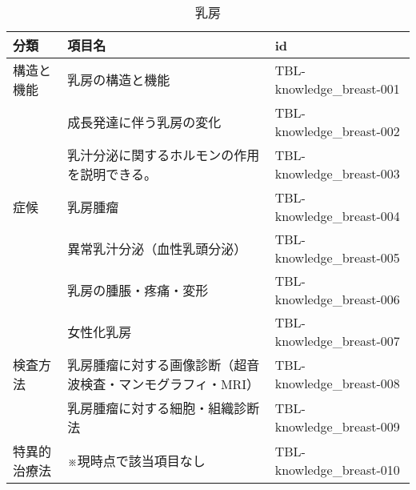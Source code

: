 \begin{xltabular}{\linewidth}{XXX}
\caption{\label{tbl:knowledge_breast}乳房} \\
\toprule
分類 & 項目名 & id \\
\midrule
\endhead
構造と機能 & 乳房の構造と機能 & TBL-knowledge_breast-001 \\
 & 成長発達に伴う乳房の変化 & TBL-knowledge_breast-002 \\
 & 乳汁分泌に関するホルモンの作用を説明できる。 & TBL-knowledge_breast-003 \\
症候 & 乳房腫瘤 & TBL-knowledge_breast-004 \\
 & 異常乳汁分泌（血性乳頭分泌） & TBL-knowledge_breast-005 \\
 & 乳房の腫脹・疼痛・変形 & TBL-knowledge_breast-006 \\
 & 女性化乳房 & TBL-knowledge_breast-007 \\
検査方法 & 乳房腫瘤に対する画像診断（超音波検査・マンモグラフィ・MRI） & TBL-knowledge_breast-008 \\
 & 乳房腫瘤に対する細胞・組織診断法 & TBL-knowledge_breast-009 \\
特異的治療法 & ※現時点で該当項目なし & TBL-knowledge_breast-010 \\
\bottomrule
\end{xltabular}

